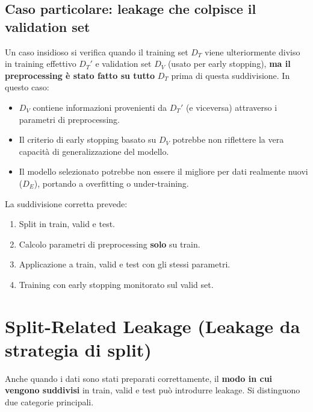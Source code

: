 \documentclass[a4paper,12pt]{article}
\begin{document}
\subsection{Caso particolare: leakage che colpisce il validation set}

Un caso insidioso si verifica quando il training set $D_T$ viene ulteriormente diviso in training effettivo $D_T'$ e validation set $D_V$ (usato per early stopping), \textbf{ma il preprocessing è stato fatto su tutto} $D_T$ prima di questa suddivisione. In questo caso:
\begin{itemize}
    \item $D_V$ contiene informazioni provenienti da $D_T'$ (e viceversa) attraverso i parametri di preprocessing.
    \item Il criterio di early stopping basato su $D_V$ potrebbe non riflettere la vera capacità di generalizzazione del modello.
    \item Il modello selezionato potrebbe non essere il migliore per dati realmente nuovi ($D_E$), portando a overfitting o under-training.
\end{itemize}

\begin{consiglio}
La suddivisione corretta prevede:
\begin{enumerate}[noitemsep]
    \item Split in train, valid e test.
    \item Calcolo parametri di preprocessing \textbf{solo} su train.
    \item Applicazione a train, valid e test con gli stessi parametri.
    \item Training con early stopping monitorato sul valid set.
\end{enumerate}
\end{consiglio}

\section{Split-Related Leakage (Leakage da strategia di split)}

Anche quando i dati sono stati preparati correttamente, il \textbf{modo in cui vengono suddivisi} in train, valid e test può introdurre leakage. Si distinguono due categorie principali.
\end{document}
